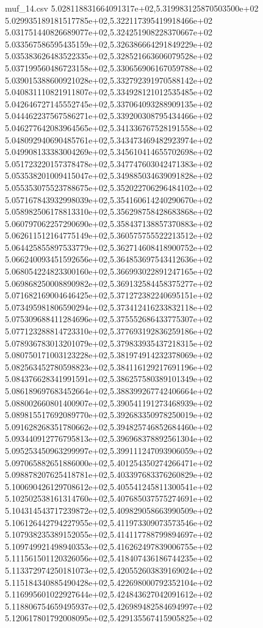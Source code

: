 \begin{filecontents*}{muf_14.csv}
5.028118831664091317e+02,5.319983125870503500e+02
5.029935189181517785e+02,5.322117395419918466e+02
5.031751440826689077e+02,5.324251908228370667e+02
5.033567586595435159e+02,5.326386664291849229e+02
5.035383626483522335e+02,5.328521663606079528e+02
5.037199560486723158e+02,5.330656906167059788e+02
5.039015388600921028e+02,5.332792391970588142e+02
5.040831110821911807e+02,5.334928121012535485e+02
5.042646727145552745e+02,5.337064093288909135e+02
5.044462237567586271e+02,5.339200308795434466e+02
5.046277642083964565e+02,5.341336767528191558e+02
5.048092940690485761e+02,5.343473469482923974e+02
5.049908133383004269e+02,5.345610414655702698e+02
5.051723220157378478e+02,5.347747603042471383e+02
5.053538201009415047e+02,5.349885034639091828e+02
5.055353075523788675e+02,5.352022706296484102e+02
5.057167843932998039e+02,5.354160614240290670e+02
5.058982506178813310e+02,5.356298758428683868e+02
5.060797062257290690e+02,5.358437138857370883e+02
5.062611512164775149e+02,5.360575755522213512e+02
5.064425855897533779e+02,5.362714608418900752e+02
5.066240093451592656e+02,5.364853697543412636e+02
5.068054224823300160e+02,5.366993022891247165e+02
5.069868250008890982e+02,5.369132584458375277e+02
5.071682169004646425e+02,5.371272382240695151e+02
5.073495981806590294e+02,5.373412416233832118e+02
5.075309688411284696e+02,5.375552686433775307e+02
5.077123288814723310e+02,5.377693192836259186e+02
5.078936783013201079e+02,5.379833935437218315e+02
5.080750171003123228e+02,5.381974914232378069e+02
5.082563452780598823e+02,5.384116129217691196e+02
5.084376628341991591e+02,5.386257580389101349e+02
5.086189697683452664e+02,5.388399267742406664e+02
5.088002660801400907e+02,5.390541191273468939e+02
5.089815517692089770e+02,5.392683350978250019e+02
5.091628268351780662e+02,5.394825746852684460e+02
5.093440912776795813e+02,5.396968378892561304e+02
5.095253450963299997e+02,5.399111247093906059e+02
5.097065882651886000e+02,5.401254350274266471e+02
5.098878207625418781e+02,5.403397683376260829e+02
5.100690426129708612e+02,5.405541245811300541e+02
5.102502538161314760e+02,5.407685037575274691e+02
5.104314543717239872e+02,5.409829058663990509e+02
5.106126442794227955e+02,5.411973309073573546e+02
5.107938235389152055e+02,5.414117788799894697e+02
5.109749921498940353e+02,5.416262497839006755e+02
5.111561501120326056e+02,5.418407436186744235e+02
5.113372974250181073e+02,5.420552603839169024e+02
5.115184340885490428e+02,5.422698000792352104e+02
5.116995601022927644e+02,5.424843627042091612e+02
5.118806754659495937e+02,5.426989482584694997e+02
5.120617801792008095e+02,5.429135567415905825e+02

\end{filecontents*}
